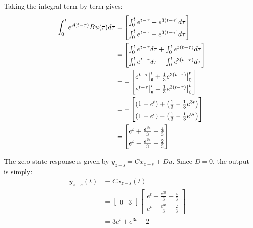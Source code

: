 Taking the integral term-by-term gives:
\[
    \phantom{\arraystretch{}}
    \begin{aligned}
    \int_{0}^{t} e^{A(t-\tau)}Bu(\tau) d\tau &=
    \begin{bmatrix}
        \int_{0}^{t} e^{t-\tau} + e^{3(t-\tau)} d\tau \\
        \int_{0}^{t} e^{t-\tau} - e^{3(t-\tau)} d\tau
    \end{bmatrix} \\
    &=
    \begin{bmatrix}
        \int_{0}^{t} e^{t-\tau} d\tau + \int_{0}^{t} e^{3(t-\tau)} d\tau \\
        \int_{0}^{t} e^{t-\tau} d\tau - \int_{0}^{t} e^{3(t-\tau)} d\tau
    \end{bmatrix} \\
    &=
    -
    \begin{bmatrix}
        e^{t-\tau} \big|_{0}^{t} + \frac{1}{3}e^{3(t-\tau)} \big|_{0}^{t} \\
        e^{t-\tau} \big|_{0}^{t} - \frac{1}{3}e^{3(t-\tau)} \big|_{0}^{t}
    \end{bmatrix} \\
    &=
    -
    \begin{bmatrix}
        (1 - e^{t}) + \left(\frac{1}{3} - \frac{1}{3}e^{3t}\right) \\
        (1 - e^{t}) - \left(\frac{1}{3} - \frac{1}{3}e^{3t}\right)
    \end{bmatrix} \\
    &=
    \begin{bmatrix}
        e^{t} + \frac{e^{3t}}{3} - \frac{4}{3} \\
        e^{t} - \frac{e^{3t}}{3} - \frac{2}{3}
    \end{bmatrix}
\end{aligned}
\]

The zero-state response is given by $y_{z-s} = Cx_{z-s} + Du$. Since $D = 0$, the output is simply:
\[
\begin{aligned}
    y_{z-s}(t) &= Cx_{z-s}(t) \\
    &=
    \begin{bmatrix}
        0 & 3
    \end{bmatrix}
    \begin{bmatrix}
        e^{t} + \frac{e^{3t}}{3} - \frac{4}{3} \\
        e^{t} - \frac{e^{3t}}{3} - \frac{2}{3}
    \end{bmatrix} \\
    &= 3e^{t} + e^{3t} - 2
\end{aligned}
\]

